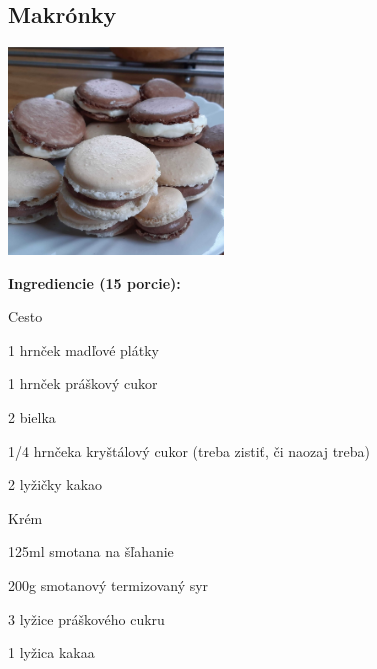 \setcounter{step}{0}

\subsection{ Makrónky }

\begin{ingredient}
  
      \includegraphics[height=5.5cm]{images/makronky}
  
  \def\portions{  }
  \textbf{ {\normalsize Ingrediencie (15 porcie):} }

  \begin{main}
      \item 
  \end{main}
  
    \begin{subingredient}{Cesto}
        \item 1 hrnček madľové plátky
        \item 1 hrnček práškový cukor
        \item 2 bielka
        \item 1/4 hrnčeka kryštálový cukor (treba zistiť, či naozaj treba)
        \item 2 lyžičky kakao
    \end{subingredient}
  
    \begin{subingredient}{Krém}
        \item 125ml smotana na šľahanie
        \item 200g smotanový termizovaný syr
        \item 3 lyžice práškového cukru
        \item 1 lyžica kakaa
    \end{subingredient}
  
\end{ingredient}
